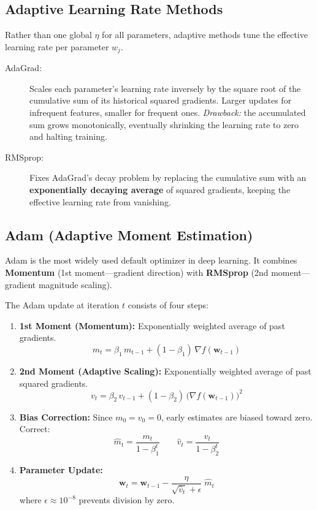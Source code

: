 \subsection*{Adaptive Learning Rate Methods}

Rather than one global $\eta$ for all parameters, adaptive methods tune the effective learning rate per parameter $w_j$.

\begin{description}
    \item[AdaGrad:] Scales each parameter's learning rate inversely by the square root of the cumulative sum of its historical squared gradients. Larger updates for infrequent features, smaller for frequent ones. \textit{Drawback:} the accumulated sum grows monotonically, eventually shrinking the learning rate to zero and halting training.

    \item[RMSprop:] Fixes AdaGrad's decay problem by replacing the cumulative sum with an \textbf{exponentially decaying average} of squared gradients, keeping the effective learning rate from vanishing.
\end{description}

\subsection*{Adam (Adaptive Moment Estimation)}

\begin{definition}
Adam is the most widely used default optimizer in deep learning. It combines \textbf{Momentum} (1st moment---gradient direction) with \textbf{RMSprop} (2nd moment---gradient magnitude scaling).
\end{definition}

The Adam update at iteration $t$ consists of four steps:

\begin{enumerate}
    \item \textbf{1st Moment (Momentum):} Exponentially weighted average of past gradients.
    $$m_t = \beta_1 \, m_{t-1} + (1 - \beta_1)\,\nabla f(\mathbf{w}_{t-1})$$

    \item \textbf{2nd Moment (Adaptive Scaling):} Exponentially weighted average of past squared gradients.
    $$v_t = \beta_2 \, v_{t-1} + (1 - \beta_2)\,\bigl(\nabla f(\mathbf{w}_{t-1})\bigr)^2$$

    \item \textbf{Bias Correction:} Since $m_0 = v_0 = 0$, early estimates are biased toward zero. Correct:
    $$\hat{m}_t = \frac{m_t}{1 - \beta_1^t} \qquad \hat{v}_t = \frac{v_t}{1 - \beta_2^t}$$

    \item \textbf{Parameter Update:}
    $$\mathbf{w}_t = \mathbf{w}_{t-1} - \frac{\eta}{\sqrt{\hat{v}_t} + \epsilon}\;\hat{m}_t$$
    where $\epsilon \approx 10^{-8}$ prevents division by zero.
\end{enumerate}


